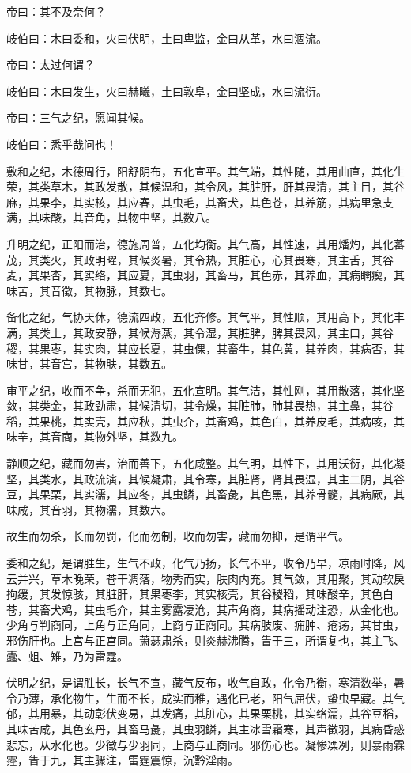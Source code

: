 \documentclass{article}%
\begin{document}
帝曰：其不及奈何？

岐伯曰：木曰委和，火曰伏明，土曰卑监，金曰从革，水曰涸流。

帝曰：太过何谓？

岐伯曰：木曰发生，火曰赫曦，土曰敦阜，金曰坚成，水曰流衍。

帝曰：三气之纪，愿闻其候。

岐伯曰：悉乎哉问也！

敷和之纪，木德周行，阳舒阴布，五化宣平。其气端，其性随，其用曲直，其化生荣，其类草木，其政发散，其候温和，其令风，其脏肝，肝其畏清，其主目，其谷麻，其果李，其实核，其应春，其虫毛，其畜犬，其色苍，其养筋，其病里急支满，其味酸，其音角，其物中坚，其数八。

升明之纪，正阳而治，德施周普，五化均衡。其气高，其性速，其用燔灼，其化蕃茂，其类火，其政明曜，其候炎暑，其令热，其脏心，心其畏寒，其主舌，其谷麦，其果杏，其实络，其应夏，其虫羽，其畜马，其色赤，其养血，其病瞤瘈，其味苦，其音徵，其物脉，其数七。

备化之纪，气协天休，德流四政，五化齐修。其气平，其性顺，其用高下，其化丰满，其类土，其政安静，其候溽蒸，其令湿，其脏脾，脾其畏风，其主口，其谷稷，其果枣，其实肉，其应长夏，其虫倮，其畜牛，其色黄，其养肉，其病否，其味甘，其音宫，其物肤，其数五。

审平之纪，收而不争，杀而无犯，五化宣明。其气洁，其性刚，其用散落，其化坚敛，其类金，其政劲肃，其候清切，其令燥，其脏肺，肺其畏热，其主鼻，其谷稻，其果桃，其实壳，其应秋，其虫介，其畜鸡，其色白，其养皮毛，其病咳，其味辛，其音商，其物外坚，其数九。

静顺之纪，藏而勿害，治而善下，五化咸整。其气明，其性下，其用沃衍，其化凝坚，其类水，其政流演，其候凝肃，其令寒，其脏肾，肾其畏湿，其主二阴，其谷豆，其果栗，其实濡，其应冬，其虫鳞，其畜彘，其色黑，其养骨髓，其病厥，其味咸，其音羽，其物濡，其数六。

故生而勿杀，长而勿罚，化而勿制，收而勿害，藏而勿抑，是谓平气。

委和之纪，是谓胜生，生气不政，化气乃扬，长气不平，收令乃早，凉雨时降，风云并兴，草木晚荣，苍干凋落，物秀而实，肤肉内充。其气敛，其用聚，其动软戾拘缓，其发惊骇，其脏肝，其果枣李，其实核壳，其谷稷稻，其味酸辛，其色白苍，其畜犬鸡，其虫毛介，其主雾露凄沧，其声角商，其病摇动注恐，从金化也。少角与判商同，上角与正角同，上商与正商同。其病肢废、痈肿、疮疡，其甘虫，邪伤肝也。上宫与正宫同。萧瑟肃杀，则炎赫沸腾，眚于三，所谓复也，其主飞、蠹、蛆、雉，乃为雷霆。

伏明之纪，是谓胜长，长气不宣，藏气反布，收气自政，化令乃衡，寒清数举，暑令乃薄，承化物生，生而不长，成实而稚，遇化已老，阳气屈伏，蛰虫早藏。其气郁，其用暴，其动彰伏变易，其发痛，其脏心，其果栗桃，其实络濡，其谷豆稻，其味苦咸，其色玄丹，其畜马彘，其虫羽鳞，其主冰雪霜寒，其声徵羽，其病昏惑悲忘，从水化也。少徵与少羽同，上商与正商同。邪伤心也。凝惨凓冽，则暴雨霖霪，眚于九，其主骤注，雷霆震惊，沉霒淫雨。
\end{document}
